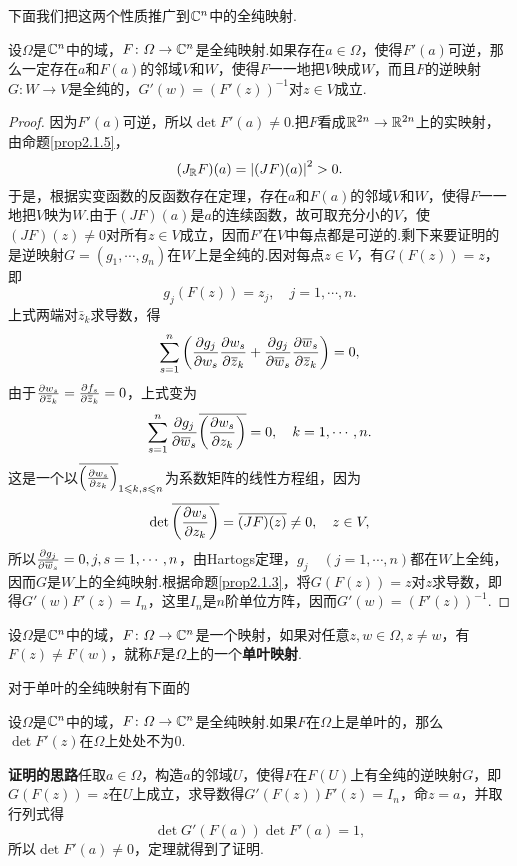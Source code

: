 下面我们把这两个性质推广到$\mathbb C^n$中的全纯映射.
\begin{theorem}\label{thm2.2.1}
	设$\Omega$是$\mathbb C^n$中的域，$F\colon\varOmega\to\mathbb C^n$是全纯映射.如果存在$a\in\Omega$，使得$F'(a)$可逆，那么一定存在$a$和$F(a)$的邻域$V$和$W$，使得$F$一一地把$V$映成$W$，而且$F$的逆映射$G\colon W\to V$是全纯的，$G'(w)=(F'(z))^{-1}$对$z\in V$成立.
\end{theorem}
\begin{proof}
	因为$F'(a)$可逆，所以$\det F'(a)\neq0$.把$F$看成$\mathbb R^{2n}\to\mathbb R^{2n}$上的实映射，由命题\ref{prop2.1.5}，
	\[(J_\mathbb R F)(a)=\left|(JF)(a)\right|^2 >0.\]
	于是，根据实变函数的反函数存在定理，存在$a$和$F(a)$的邻域$V$和$W$，使得$F$一一地把$V$映为$W$.由于$(JF)(a)$是$a$的连续函数，故可取充分小的$V$，使$(JF)(z)\neq0$对所有$z\in V$成立，因而$F'$在$V$中每点都是可逆的.剩下来要证明的是逆映射$G=(g_1,\cdots,g_n)$在$W$上是全纯的.因对每点$z\in V$，有$G(F(z))=z$，即
	\[g_j(F(z))=z_j,\quad j=1,\cdots,n.\]
	上式两端对$\bar{z}_k$求导数，得
	\[\sum_{s=1}^{n}\left(\frac{\partial g_j}{\partial w_s}\frac{\partial w_s}{\partial {}\mkern1mu\overline{\mkern-1muz}_k}+\frac{\partial g_j}{\partial {}\mkern1mu\overline{\mkern-1muw}_s}\frac{\partial {}\mkern1mu\overline{\mkern-1muw}_s}{\partial {}\mkern1mu\overline{\mkern-1muz}_k}\right)=0,\]
	由于$\frac{\partial w_s}{\partial {}\mkern1mu\overline{\mkern-1muz}_k}=\frac{\partial f_s}{\partial {}\mkern1mu\overline{\mkern-1muz}_k}=0$，上式变为
	\[\sum_{s=1}^{n}\frac{\partial g_j}{\partial {}\mkern1mu\overline{\mkern-1muw}_s}{}\mkern1mu\overline{\mkern-1mu\left(\frac{\partial w_s}{\partial z_k}\right)}=0,\quad k=1,\cdots,n.\]
	这是一个以${}\mkern1mu\overline{\mkern-1mu\left(\frac{\partial w_s}{\partial z_k}\right)}_{1\leqslant k,s\leqslant n}$为系数矩阵的线性方程组，因为
	\[\det{}\mkern1mu\overline{\mkern-1mu\left(\frac{\partial w_s}{\partial z_k}\right)}={}\mkern1mu\overline{\mkern-1mu(JF)(z)}\neq0,\quad z\in V,\]
	所以$\frac{\partial g_j}{\partial {}\mkern1mu\overline{\mkern-1muw}_s}=0,j,s=1,\cdots,n$，由Hartogs定理，$g_j\quad(j=1,\cdots,n)$都在$W$上全纯，因而$G$是$W$上的全纯映射.根据命题\ref{prop2.1.3}，将$G(F(z))=z$对$z$求导数，即得$G'(w)F'(z)=I_n$，这里$I_n$是$n$阶单位方阵，因而$G'(w)=(F'(z))^{-1}$.
\end{proof}
\begin{definition}\label{def2.2.2}
	设$\Omega$是$\mathbb C^n$中的域，$F\colon\varOmega\to\mathbb C^n$是一个映射，如果对任意$z,w\in\Omega,z\neq w$，有$F(z)\neq F(w)$，就称$F$是$\Omega$上的一个\textbf{单叶映射}.
\end{definition}
对于单叶的全纯映射有下面的
\begin{theorem}\label{thm2.2.3}
	设$\Omega$是$\mathbb C^n$中的域，$F\colon\varOmega\to\mathbb C^n$是全纯映射.如果$F$在$\Omega$上是单叶的，那么$\det F'(z)$在$\Omega$上处处不为$0$.
\end{theorem}
\textbf{证明的思路}\quad 任取$a\in\Omega$，构造$a$的邻域$U$，使得$F$在$F(U)$上有全纯的逆映射$G$，即$G(F(z))=z$在$U$上成立，求导数得$G'(F(z))F'(z)=I_n$，命$z=a$，并取行列式得
\[\det G'(F(a))\det F'(a)=1,\]
所以$\det F'(a)\neq0$，定理就得到了证明.
